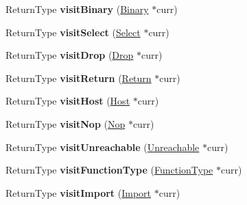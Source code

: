 \begin{DoxyCompactItemize}
\item 
\mbox{\label{structwasm_1_1_visitor_a397d39311d8419c59e9c16467055fbeb}} 
Return\+Type {\bfseries visit\+Binary} (\mbox{\hyperlink{classwasm_1_1_binary}{Binary}} $\ast$curr)
\item 
\mbox{\label{structwasm_1_1_visitor_aa7cc25de9c2fc1d45a523d56025532a4}} 
Return\+Type {\bfseries visit\+Select} (\mbox{\hyperlink{classwasm_1_1_select}{Select}} $\ast$curr)
\item 
\mbox{\label{structwasm_1_1_visitor_a5f25adc70b9f2b951927dc662b0bcdd1}} 
Return\+Type {\bfseries visit\+Drop} (\mbox{\hyperlink{classwasm_1_1_drop}{Drop}} $\ast$curr)
\item 
\mbox{\label{structwasm_1_1_visitor_a2d6d749988231b4a5638fc043f5ee22e}} 
Return\+Type {\bfseries visit\+Return} (\mbox{\hyperlink{classwasm_1_1_return}{Return}} $\ast$curr)
\item 
\mbox{\label{structwasm_1_1_visitor_a9a759d862bc0633932ff7754dee1ae0c}} 
Return\+Type {\bfseries visit\+Host} (\mbox{\hyperlink{classwasm_1_1_host}{Host}} $\ast$curr)
\item 
\mbox{\label{structwasm_1_1_visitor_a9cad632a207f4d654a4729712ac5218b}} 
Return\+Type {\bfseries visit\+Nop} (\mbox{\hyperlink{classwasm_1_1_nop}{Nop}} $\ast$curr)
\item 
\mbox{\label{structwasm_1_1_visitor_a0ecedce32679bfd49f0f4849d912b57c}} 
Return\+Type {\bfseries visit\+Unreachable} (\mbox{\hyperlink{classwasm_1_1_unreachable}{Unreachable}} $\ast$curr)
\item 
\mbox{\label{structwasm_1_1_visitor_a65116c9542ab25c0904dd5253fcf20a0}} 
Return\+Type {\bfseries visit\+Function\+Type} (\mbox{\hyperlink{classwasm_1_1_function_type}{Function\+Type}} $\ast$curr)
\item 
\mbox{\label{structwasm_1_1_visitor_a4eba012e825df6487970c79c1c841514}} 
Return\+Type {\bfseries visit\+Import} (\mbox{\hyperlink{classwasm_1_1_import}{Import}} $\ast$curr)

\end{DoxyCompactItemize}
